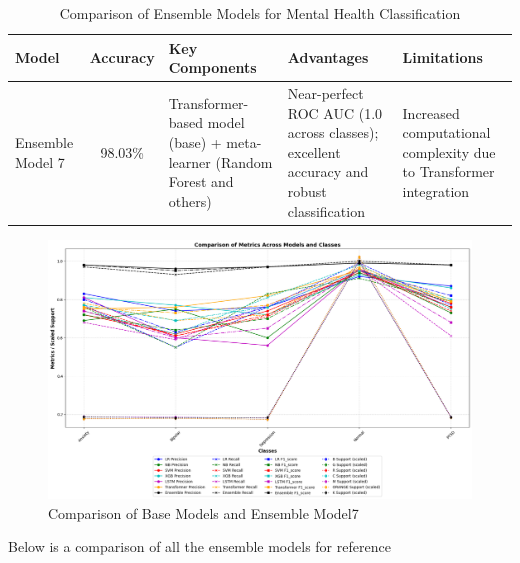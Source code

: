 \begin{table}[H]
    \centering
    \caption*{Comparison of Ensemble Models for Mental Health Classification}
    \label{tab:ensemble_comparison}
    \begin{tabularx}{\textwidth}{|l|c|X|X|X|}
    \hline
    \textbf{Model} & \textbf{Accuracy} & \textbf{Key Components} & \textbf{Advantages} & \textbf{Limitations} \\
    \hline
    Ensemble Model 7 & 98.03\% & Transformer-based model (base) + meta-learner (Random Forest and others) & Near-perfect ROC AUC (1.0 across classes); excellent accuracy and robust classification & Increased computational complexity due to Transformer integration \\
    \hline
    \end{tabularx}
\end{table}

    
\begin{figure}[h!]  
    \centering
    \includegraphics[width=1.0\textwidth]{Images/EM T RESULT.png}  
    \caption{Comparison of Base Models and Ensemble Model7}
    \label{lstm arch}  %
\end{figure}

\pagebreak

\noindent
Below is a comparison of all the ensemble models for reference

